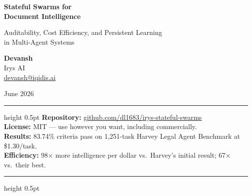 \documentclass[11pt,a4paper]{article}
\begin{document}

\begin{titlepage}
\begin{center}

\vspace*{2cm}

{\fontsize{28}{34}\selectfont\bfseries\color{irysblue} Stateful Swarms for\\[8pt] Document Intelligence}

\vspace{1.2cm}

{\Large Auditability, Cost Efficiency, and Persistent Learning\\[4pt] in Multi-Agent Systems}

\vspace{2cm}

{\large\bfseries Devansh}\\[6pt]
{\large Irys AI}\\[6pt]
{\normalsize\href{mailto:devansh@iqidis.ai}{devansh@iqidis.ai}}

\vspace{1.5cm}

{\normalsize June 2026}

\vspace{2.5cm}

\begin{minipage}{0.85\textwidth}
\hrule height 0.5pt
\vspace{12pt}
\noindent\textbf{Repository:} \href{https://github.com/dl1683/irys-stateful-swarms}{github.com/dl1683/irys-stateful-swarms}\\
\textbf{License:} MIT — use however you want, including commercially.\\
\textbf{Results:} 83.74\% criteria pass on 1,251-task Harvey Legal Agent Benchmark at \$1.30/task.\\
\textbf{Efficiency:} 98$\times$ more intelligence per dollar vs.\ Harvey's initial result; 67$\times$ vs.\ their best.
\vspace{12pt}
\hrule height 0.5pt
\end{minipage}

\end{center}
\end{titlepage}

\end{document}
